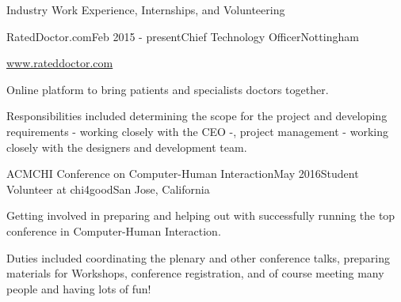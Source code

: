 \documentclass{resume} %
\begin{document}


\begin{rSection}{Industry Work Experience, Internships, and Volunteering}
    \begin{rSubsection}{RatedDoctor.com}{Feb 2015 - present}{Chief Technology Officer}{Nottingham}
        \item \url{www.rateddoctor.com}
        \item Online platform to bring patients and specialists doctors together.
        \item Responsibilities included determining the scope for the project and developing requirements - working closely with the CEO -, project management - working closely with the designers and development team.
    \end{rSubsection}

	\begin{rSubsection}{ACMCHI Conference on  Computer-Human Interaction}{May 2016}{Student Volunteer at chi4good}{San Jose, California}
        \item Getting involved in preparing and helping out with successfully running the top conference in Computer-Human Interaction. 
        \item Duties included coordinating the plenary and other conference talks, preparing materials for Workshops, conference registration, and of course meeting many people and having lots of fun!
    \end{rSubsection}


\end{rSection}
\end{document}
